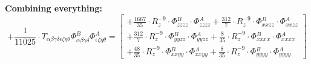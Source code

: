 \documentclass{article}
\begin{document}
\textbf{Combining everything:}
\begin{equation}
+ \frac{1}{11025} \cdot T_{\alpha{}\beta{}\gamma{}\delta{}\epsilon{}\zeta{}\eta{}\theta{}} \Phi{}^{B}_{\alpha{}\beta{}\gamma{}\delta{}} \Phi{}^{A}_{\epsilon{}\zeta{}\eta{}\theta{}} =  \left[ \begin{array}{c} 
 		+ \frac{1667}{35} \cdot R_{z}^{-9} \cdot \Phi{}^{B}_{zzzz} \cdot \Phi{}^{A}_{zzzz}+ \frac{312}{7} \cdot R_{z}^{-9} \cdot \Phi{}^{B}_{xxzz} \cdot \Phi{}^{A}_{xxzz} 
 \\[0.2em] 		 + \frac{312}{7} \cdot R_{z}^{-9} \cdot \Phi{}^{B}_{yyzz} \cdot \Phi{}^{A}_{yyzz}+ \frac{8}{35} \cdot R_{z}^{-9} \cdot \Phi{}^{B}_{xxxx} \cdot \Phi{}^{A}_{xxxx} 
 \\[0.2em] 		 + \frac{48}{35} \cdot R_{z}^{-9} \cdot \Phi{}^{B}_{xxyy} \cdot \Phi{}^{A}_{xxyy}+ \frac{8}{35} \cdot R_{z}^{-9} \cdot \Phi{}^{B}_{yyyy} \cdot \Phi{}^{A}_{yyyy}
 \end{array}\right] 
\end{equation}
\end{document}
